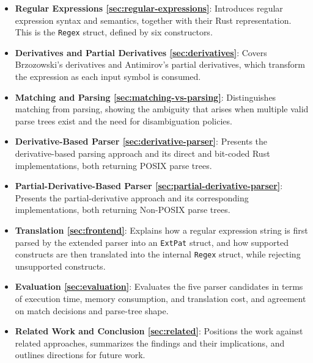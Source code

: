 \begin{itemize}
  \item \textbf{Regular Expressions \ref{sec:regular-expressions}}:
        Introduces regular expression syntax and semantics, together with
        their Rust representation. This is the \texttt{Regex} struct,
        defined by six constructors.

  \item \textbf{Derivatives and Partial Derivatives \ref{sec:derivatives}}:
        Covers Brzozowski's derivatives and Antimirov's partial derivatives,
        which transform the expression as each input symbol is consumed.

  \item \textbf{Matching and Parsing \ref{sec:matching-vs-parsing}}:
        Distinguishes matching from parsing, showing the ambiguity that arises 
        when multiple valid parse trees exist and the need for
        disambiguation policies.

  \item \textbf{Derivative-Based Parser \ref{sec:derivative-parser}}:
        Presents the derivative-based parsing approach and its direct and
        bit-coded Rust implementations, both returning POSIX parse trees.

  \item \textbf{Partial-Derivative-Based Parser
        \ref{sec:partial-derivative-parser}}:
        Presents the partial-derivative approach and its corresponding
        implementations, both returning Non-POSIX parse trees.

  \item \textbf{Translation \ref{sec:frontend}}:
        Explains how a regular expression string is first parsed by the
        extended parser into an \texttt{ExtPat} struct, 
        and how supported constructs are then translated 
        into the internal \texttt{Regex} struct, 
        while rejecting unsupported constructs.

  \item \textbf{Evaluation \ref{sec:evaluation}}:
        Evaluates the five parser candidates in terms of execution time,
        memory consumption, and translation cost, and
        agreement on match decisions and parse-tree shape.

  \item \textbf{Related Work and Conclusion \ref{sec:related}}:
        Positions the work against related approaches, summarizes the
        findings and their implications, and outlines directions for
        future work.
\end{itemize}